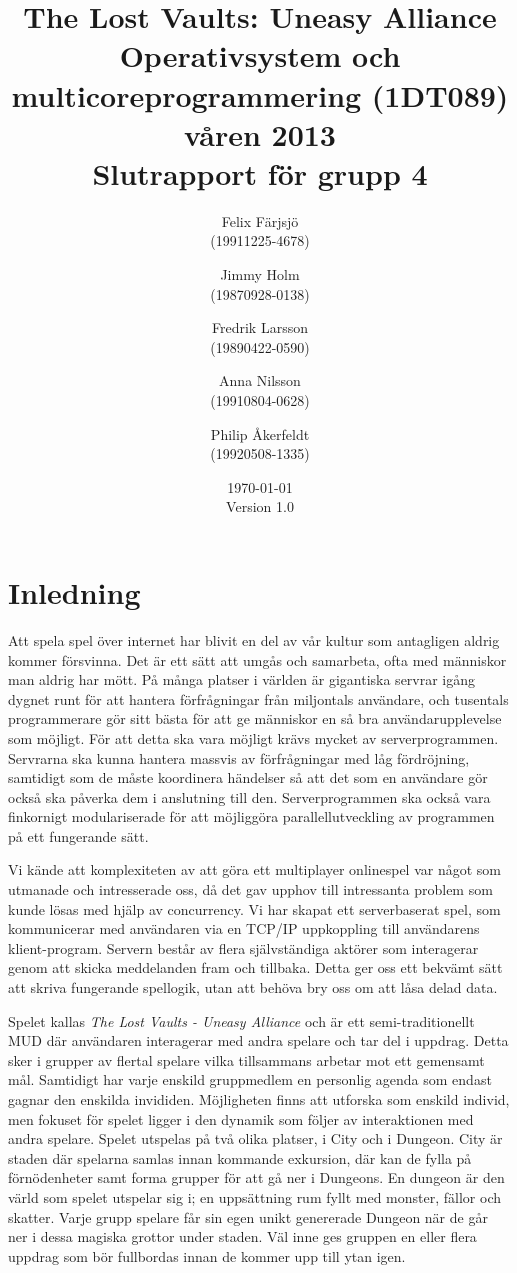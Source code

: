 \documentclass[a4paper]{article}
\title{The Lost Vaults: Uneasy Alliance\\\small{Operativsystem och multicoreprogrammering (1DT089) våren 2013}\\\small{Slutrapport för grupp 4}}
\author{Felix Färjsjö\\(19911225-4678) \and Jimmy Holm\\(19870928-0138) \and Fredrik Larsson\\(19890422-0590) \and Anna Nilsson\\(19910804-0628) \and Philip Åkerfeldt\\(19920508-1335)}
\date{\today\\Version 1.0}
\begin{document}
\maketitle
\thispagestyle{empty}
\newpage
\setcounter{page}{1}

\tableofcontents
\listoffigures
\newpage
\setcounter{page}{1}
\section{Inledning}
Att spela spel över internet har blivit en del av vår kultur som antagligen aldrig kommer försvinna. Det är ett sätt att umgås och samarbeta, ofta med människor man aldrig har mött. 
På många platser i världen är gigantiska servrar igång dygnet runt för att hantera förfrågningar från miljontals användare, och tusentals programmerare gör sitt bästa för 
att ge människor en så bra användarupplevelse som möjligt. 
För att detta ska vara möjligt krävs mycket av serverprogrammen. 
Servrarna ska kunna hantera massvis av förfrågningar med låg fördröjning, samtidigt som de måste koordinera händelser så att det som en användare gör också ska påverka dem i anslutning till den. 
Serverprogrammen ska också vara finkornigt modulariserade för att möjliggöra parallellutveckling av programmen på ett fungerande sätt.  
 
Vi kände att komplexiteten av att göra ett multiplayer onlinespel var något som utmanade och intresserade oss, då det gav upphov till intressanta problem som kunde lösas med hjälp av concurrency. 
Vi har skapat ett serverbaserat spel, som kommunicerar med användaren via en TCP/IP uppkoppling till användarens klient-program. Servern består av flera självständiga aktörer som interagerar
genom att skicka meddelanden fram och tillbaka. Detta ger oss ett bekvämt sätt att skriva fungerande spellogik, utan att behöva bry oss om att låsa delad data.

Spelet kallas \textit{The Lost Vaults - Uneasy Alliance} och är ett semi-traditionellt MUD där användaren interagerar med andra spelare och tar del i uppdrag. 
Detta sker i grupper av flertal spelare vilka tillsammans arbetar mot ett gemensamt mål. Samtidigt har varje enskild gruppmedlem en personlig agenda som endast 
gagnar den enskilda invididen. Möjligheten finns att utforska som enskild individ, men fokuset för spelet ligger i den dynamik som följer av 
interaktionen med andra spelare. Spelet utspelas på två olika platser, i City och i Dungeon. City är staden där spelarna samlas innan kommande exkursion, där kan de fylla på förnödenheter samt forma grupper för att gå ner i Dungeons. En dungeon är den värld som spelet utspelar sig i; en uppsättning rum fyllt med monster, fällor och skatter. 
Varje grupp spelare får sin egen unikt genererade Dungeon när de går ner i dessa magiska grottor under staden. Väl inne ges gruppen en eller flera uppdrag som bör fullbordas innan de kommer upp till ytan igen.
\end{document}
